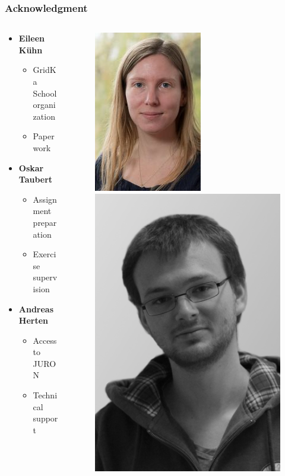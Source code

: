 \documentclass[aspectratio=1610]{beamer}
\begin{document}
\begin{frame}
\frametitle{Acknowledgment}

\begin{columns}
    \begin{column}{0.48\textwidth}
        \begin{itemize}
            \item \textbf{Eileen Kühn}
            \begin{itemize}
                \item GridKa School organization
                \item Paperwork
            \end{itemize}
            \item \textbf{Oskar Taubert}
            \begin{itemize}
                \item Assignment preparation
                \item Exercise supervision
            \end{itemize}
            \item \textbf{Andreas Herten}
            \begin{itemize}
                \item Access to JURON
                \item Technical support
            \end{itemize}
        \end{itemize}
    \end{column}

    \begin{column}{0.48\textwidth}
        \begin{figure}
            \includegraphics[width=0.25\linewidth]{eileen.jpg}\quad \includegraphics[width=0.25\linewidth]{oskar.jpg} \\\medskip
            

\end{figure}
\end{column}
\end{columns}
\end{frame}
\end{document}

